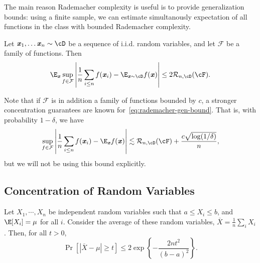 The main reason Rademacher complexity is useful is to provide generalization bounds: using a finite sample, we can estimate simultanously expectation of all functions in the class with bounded Rademacher complexity.
\begin{theorem}
\label{thm:rademacher-generalization-bound}
    Let $\xx_1, \ldots \xx_n\sim \cD$ be a sequence of i.i.d. random variables, and let $\mathcal{F}$ be a family of functions. Then
    \begin{equation}
        \E_{\xx} \sup_{f \in \mathcal{F}} \left|\frac{1}{n} \sum_{i \leq n}f(\xx_i) - \E_{\xx \sim \cD} f(\xx)\right| \leq 2 \mathcal{R}_{n, \cD}(\cF). \label{eq:rademacher-gen-bound}
    \end{equation}
\end{theorem}
Note that if $\mathcal{F}$ is in addition a family of functions bounded by $c$, a stronger concentration guarantees are known for~\eqref{eq:rademacher-gen-bound}. That is, with probability $1-\delta$, we have
\begin{equation*}
    \sup_{f \in \mathcal{F}} \left|\frac{1}{n} \sum_{i \leq n}f(\xx_i) - \E_{\xx} f(\xx)\right| \lesssim \mathcal{R}_{n, \cD}(\cF) + \frac{c \sqrt{\log (1/\delta)}}{n},
\end{equation*}
but we will not be using this bound explicitly.



\subsection*{Concentration of Random Variables}

\begin{lemma}\label{lem:hoeff}
    Let $X_1,\cdots, X_n$ be independent random variables such that $a\leq X_i\leq b$, and $\E[X_i] = \mu$ for all $i$.
Consider the average of these random variables, $\overline{X} = \frac{1}{n}\sum_i X_i$. Then, for all $t>0$,
\[
\Pr\left[|\overline{X} - \mu|\geq t\right] \leq 2\exp\left\{-\frac{2nt^2}{(b-a)^2}\right\}.
\]
\end{lemma}

